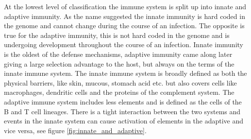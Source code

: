 At the lowest level of classification the immune system is split up into innate and adaptive immunity.
As the name suggested the innate immunity is hard coded in the genome and cannot change during the course of an infection.
The opposite is true for the adaptive immunity, this is not hard coded in the genome and is undergoing development throughout the course of an infection.
Innate immunity is the oldest of the defense mechanisms, adaptive immunity came along later giving a large selection advantage to the host, but always on the terms of the innate immune system.
The innate immune system is broadly defined as both the physical barriers, like skin, mucous, stomach acid etc. but also covers cells like macrophages, dendritic cells and the proteins of the complement system.
The adaptive immune system includes less elements and is defined as the cells of the B and T cell lineages.
There is a tight interaction between the two systems and events in the innate system can cause activation of elements in the adaptive and vice versa, see figure \ref{fig:innate_and_adaptive}.

